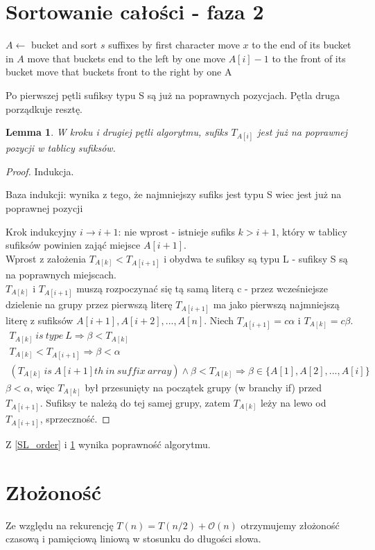 \documentclass[
12pt
]{article}
\newtheorem{lemma}[theorem]{Lemma}
\theoremstyle{definition}
\theoremstyle{remark}
\begin{document}
\section*{Sortowanie całości - faza 2}
\begin{algorithmic}
\State $A \gets$ bucket and sort $s$ suffixes by first character
\State move $x$ to the end of its bucket in $A$
\State move that buckets end to the left by one
\EndFor
{}
\State move $A[i]-1$ to the front of its bucket
\State move that buckets front to the right by one
\EndIf
\EndFor
\State \Return A
\EndProcedure
\end{algorithmic}

Po pierwszej pętli sufiksy typu S są już na poprawnych pozycjach. Pętla druga porządkuje resztę.

\begin{lemma}\label{phase2-invariant}
W kroku i drugiej pętli algorytmu, sufiks $T_{A[i]}$ jest już na poprawnej pozycji w tablicy sufiksów.
\end{lemma}
\begin{proof}
Indukcja.
\item[Baza indukcji:] wynika z tego, że najmniejszy sufiks jest typu S wiec jest już na poprawnej pozycji
\item[Krok indukcyjny $i \rightarrow i+1$:] nie wprost - istnieje sufiks $k > i+1$, który w tablicy sufiksów powinien zająć miejsce $A[i+1]$.\\
Wprost z założenia $T_{A[k]} < T_{A[i+1]}$ i obydwa te sufiksy są typu L - sufiksy S są na poprawnych miejscach.\\
$T_{A[k]}$ i $T_{A[i+1]}$ muszą rozpoczynać się tą samą literą c - przez wcześniejsze dzielenie na grupy przez pierwszą literę $T_{A[i+1]}$ ma jako pierwszą najmniejszą literę z sufiksów $A[i+1],A[i+2],...,A[n]$. Niech $T_{A[i+1]}=c \alpha$ i $T_{A[k]}=c \beta$.\\
\begin{gather*}
T_{A[k]}\ is\ type\ L \Rightarrow \beta < T_{A[k]}\\
T_{A[k]} < T_{A[i+1]} \Rightarrow \beta < \alpha\\
(T_{A[k]}\ is\ A[i+1]th\ in\ suffix\ array) \land \beta < T_{A[k]} \Rightarrow \beta \in \{A[1],A[2],...,A[i]\}
\end{gather*}
$\beta < \alpha$, więc $T_{A[k]}$ był przesunięty na początek grupy (w branchy if) przed $T_{A[i+1]}$. Sufiksy te należą do tej samej grupy, zatem $T_{A[k]}$ leży na lewo od $T_{A[i+1]}$, sprzeczność.
\end{proof}

Z \cref{SL_order} i \cref{phase2-invariant} wynika poprawność algorytmu.


\section*{Złożoność}
Ze względu na rekurencję $T(n) = T(n/2) + \mathcal{O}(n)$ otrzymujemy złożoność czasową i pamięciową liniową w stosunku do długości słowa.
\end{document}
